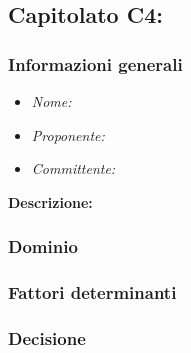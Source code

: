 \subsection{Capitolato C4: \textit{}}
\subsubsection{Informazioni generali}
\begin{itemize}
    \item \textit{Nome:}
    \item \textit{Proponente:}
    \item \textit{Committente:}
\end{itemize}
\textbf{Descrizione:}
\subsubsection{Dominio}
\subsubsection{Fattori determinanti}
\subsubsection{Decisione}
